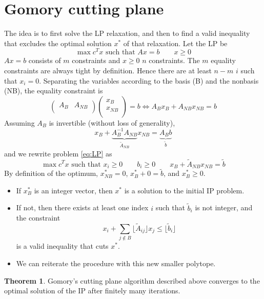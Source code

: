 \documentclass[11pt, openany]{report}
\theoremstyle{definition}
\newtheorem{thm}{Theorem}[chapter]
\begin{document}
\section{Gomory cutting plane}
The idea is to first solve the LP relaxation, and then to find a valid inequality that excludes the optimal solution $x^*$ of that relaxation. Let the LP be 
\begin{equation}\label{eq:LP}
    \max c^Tx \text{ such that } Ax=b\qquad x\ge 0
\end{equation}
$Ax=b$ consists of $m$ constraints and $x\ge0$ $n$ constraints. The $m$ equality constraints are always tight by definition. Hence there are at least $n-m$ $i$ such that $x_i=0$. Separating the variables according to the basis (B) and the nonbasis (NB), the equality constraint is 
\begin{equation}
    \begin{pmatrix}
        A_B & A_{NB} \\
    \end{pmatrix} \begin{pmatrix}
        x_B \\ x_{NB}\\
    \end{pmatrix} = b \Longleftrightarrow A_Bx_B + A_{NB}x_{NB} = b
\end{equation}
Assuming $A_B$ is invertible (without loss of generality), 
\begin{equation}
    x_B + \underbrace{A_B^{-1}A_{NB}}_{\tilde A_{NB}} x_{NB} = \underbrace{A_Bb}_{\tilde b}
\end{equation}
and we rewrite problem \eqref{eq:LP} as 
\begin{equation}
    \max c^Tx \text{ such that } x_i\ge0\qquad b_i\ge 0\qquad x_B + \tilde A_{NB}x_{NB} = \tilde b
\end{equation}
By definition of the optimum, $x_{NB}^* = 0$, $x_B^* + 0 = \tilde b$, and $x_B^* \ge0$. 
\begin{itemize}
    \item If $x_B^*$ is an integer vector, then $x^*$ is a solution to the initial IP problem. 
    \item If not, then there exists at least one index $i$ such that $\tilde b_i$ is not integer, and the constraint 
    \begin{equation}
        x_i + \sum_{j\not \in B} \lfloor \tilde A_{ij}\rfloor x_j \le \lfloor \tilde b_i\rfloor
    \end{equation}
    is a valid inequality that cuts $x^*$. 
    \item We can reiterate the procedure with this new smaller polytope. 
\end{itemize}
\begin{thm}
    Gomory's cutting plane algorithm described above converges to the optimal solution of the IP after finitely many iterations.
\end{thm}
\end{document}
